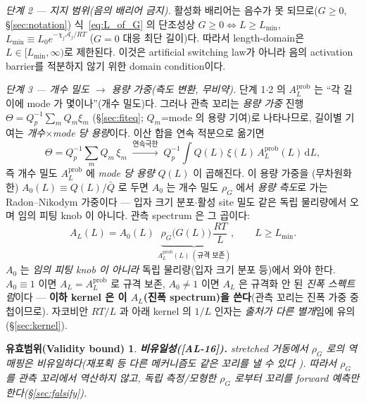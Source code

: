 \documentclass[11pt,a4paper]{article}
\newtheorem*{boundbox}{유효범위(Validity bound)}
\newcommand{\dd}{\mathrm{d}}
\newcommand{\AL}[1]{\textsf{[AL-#1]}}
\begin{document}
\emph{단계 2 — 지지 범위(음의 배리어 금지).} 활성화 배리어는 음수가 못 되므로($G\ge0$, \S\ref{sec:notation})
식~\eqref{eq:L_of_G} 의 단조성상 $G\ge0\Leftrightarrow L\ge L_{\min}$, $L_{\min}\equiv L_0 e^{-\chi_j\mathcal A_j/RT}$
($G=0$ 대응 최단 길이)다. 따라서 length-domain은 $L\in[L_{\min},\infty)$로 제한된다. 이것은 artificial switching law가 아니라
음의 activation barrier를 적분하지 않기 위한 domain condition이다.

\emph{단계 3 — 개수 밀도 $\to$ 용량 가중(측도 변환, 무비약).} 단계 1$\cdot$2 의 $A_L^{\mathrm{prob}}$ 는 ``각 길이에
mode 가 몇이나''(개수 밀도)다. 그러나 관측 꼬리는 \emph{용량 가중} 진행 $\Theta=Q_p^{-1}\sum_m Q_m\xi_m$
(\S\ref{sec:fiteq}; $Q_m$=mode 의 용량 기여)로 나타나므로, 길이별 기여는 \emph{개수}$\times$\emph{mode 당 용량}이다.
이산 합을 연속 적분으로 옮기면
\begin{equation*}
\Theta=Q_p^{-1}\sum_m Q_m\,\xi_m\;\xrightarrow{\text{연속극한}}\;Q_p^{-1}\!\int Q(L)\,\xi(L)\,A_L^{\mathrm{prob}}(L)\,\dd L,
\end{equation*}
즉 개수 밀도 $A_L^{\mathrm{prob}}$ 에 \emph{mode 당 용량} $Q(L)$ 이 곱해진다. 이 용량 가중을 (무차원화한)
$A_0(L)\equiv Q(L)/\bar Q$ 로 두면 $A_0$ 는 개수 밀도 $\rho_G$ 에서 \emph{용량 측도}로 가는 Radon--Nikodym
가중이다 — 입자 크기 분포$\cdot$활성 site 밀도 같은 독립 물리량에서 오며 임의 피팅 knob 이 아니다. 관측 spectrum 은
그 곱이다:
\begin{equation}
\boxed{\;A_L(L)=A_0(L)\;\underbrace{\rho_G\big(G(L)\big)\,\frac{RT}{L}}_{\displaystyle A_L^{\mathrm{prob}}(L)\ (\text{규격 보존})},\qquad L\ge L_{\min}.\;}
\label{eq:spectrum}
\end{equation}
$A_0$ 는 \emph{임의 피팅 knob 이 아니라} 독립 물리량(입자 크기 분포 등)에서 와야 한다. $A_0\equiv1$ 이면
$A_L=A_L^{\mathrm{prob}}$ 로 규격 보존, $A_0\ne1$ 이면 $A_L$ 은 규격화 안 된 \emph{진폭 스펙트럼}이다 — \textbf{이하
kernel 은 이 $A_L$(진폭 spectrum)을 쓴다}(관측 꼬리는 진폭 가중 중첩이므로). 자코비안 $RT/L$ 과 아래 kernel 의
$1/L$ 인자는 \emph{출처가 다른 별개}임에 유의(\S\ref{sec:kernel}).
\begin{boundbox}
\textbf{비유일성(\AL{16}).} stretched 거동에서 $\rho_G$ 로의 역매핑은 \emph{비유일}하다(재포획 등 다른
메커니즘도 같은 꼬리를 낼 수 있다 \cite{baessler1993}). 따라서 $\rho_G$ 를 관측 꼬리에서 \emph{역산하지
않고}, 독립 측정/모형한 $\rho_G$ 로부터 꼬리를 \emph{forward 예측}만 한다(\S\ref{sec:falsify}).
\end{boundbox}

\end{document}
